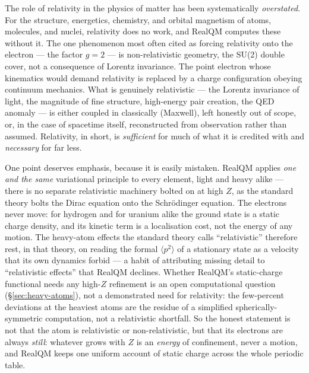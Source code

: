 The role of relativity in the physics of matter has been systematically \emph{overstated}. For the structure,
energetics, chemistry, and orbital magnetism of atoms, molecules, and nuclei, relativity does no work, and RealQM
computes these without it. The one phenomenon most often cited as forcing relativity onto the electron --- the
factor $g=2$ --- is non-relativistic geometry, the SU(2) double cover, not a consequence of Lorentz invariance.
The point electron whose kinematics would demand relativity is replaced by a charge configuration obeying
continuum mechanics. What is genuinely relativistic --- the Lorentz invariance of light, the magnitude of fine
structure, high-energy pair creation, the QED anomaly --- is either coupled in classically (Maxwell), left
honestly out of scope, or, in the case of spacetime itself, reconstructed from observation rather than assumed.
Relativity, in short, is \emph{sufficient} for much of what it is credited with and \emph{necessary} for far
less.

One point deserves emphasis, because it is easily mistaken. RealQM applies \emph{one and the same} variational
principle to every element, light and heavy alike --- there is no separate relativistic machinery bolted on at
high $Z$, as the standard theory bolts the Dirac equation onto the Schr\"odinger equation. The electrons never
move: for hydrogen and for uranium alike the ground state is a static charge density, and its kinetic term is a
localisation cost, not the energy of any motion. The heavy-atom effects the standard theory calls
``relativistic'' therefore rest, in that theory, on reading the formal $\langle p^2\rangle$ of a stationary state
as a velocity that its own dynamics forbid --- a habit of attributing missing detail to ``relativistic effects''
that RealQM declines. Whether RealQM's static-charge functional needs any high-$Z$ refinement is an open
computational question (\S\ref{sec:heavy-atoms}), not a demonstrated need for relativity: the few-percent
deviations at the heaviest atoms are the residue of a simplified spherically-symmetric computation, not a
relativistic shortfall. So the honest statement is not that the atom is relativistic or non-relativistic, but that
its electrons are always \emph{still}: whatever grows with $Z$ is an \emph{energy} of confinement, never a
motion, and RealQM keeps one uniform account of static charge across the whole periodic table.

